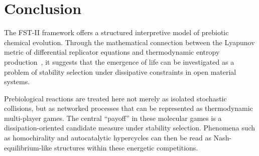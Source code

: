 \documentclass[12pt,a4paper]{article}
\theoremstyle{remark}
\begin{document}
\section{Conclusion}
\label{sec:conclusion}

The FST-II framework offers a structured interpretive model of prebiotic chemical evolution. Through the mathematical connection between the Lyapunov metric of differential replicator equations and thermodynamic entropy production~\citep{ReplicatorEntropy}, it suggests that the emergence of life can be investigated as a problem of stability selection under dissipative constraints in open material systems.

Prebiological reactions are treated here not merely as isolated stochastic collisions, but as networked processes that can be represented as thermodynamic multi-player games. The central ``payoff'' in these molecular games is a dissipation-oriented candidate measure under stability selection. Phenomena such as homochirality and autocatalytic hypercycles can then be read as Nash-equilibrium-like structures within these energetic competitions.
\end{document}
